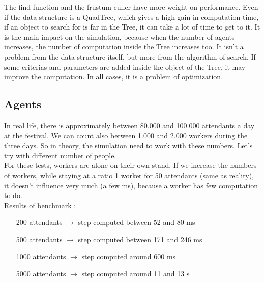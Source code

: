 The find function and the frustum culler have more weight on performance. Even if the data structure is a QuadTree, which gives a high gain in computation time, if an object to search for is far in the Tree, it can take a lot of time to get to it. It is the main impact on the simulation, because when the number of agents increases, the number of computation inside the Tree increases too. It isn’t a problem from the data structure itself, but more from the algorithm of search. If some criterias and parameters are added inside the object of the Tree, it may improve the computation. In all cases, it is a problem of optimization.

\subsection{Agents}

In real life, there is approximately between 80.000 and 100.000 attendants a day at the festival. We can count also between 1.000 and 2.000 workers during the three days. So in theory, the simulation need to work with these numbers. Let’s try with different number of people.\\
 
For these tests, workers are alone on their own stand. If we increase the numbers of workers, while staying at a ratio 1 worker for 50 attendants (same as reality), it doesn’t influence very much (a few ms), because a worker has few computation to do.\\

Results of benchmark :\\

\begin{itemize}
	\item[200 attendants] $\rightarrow$ step computed between 52 and 80 ms
	\item[500 attendants] $\rightarrow$ step computed between 171 and 246 ms
	\item[1000 attendants] $\rightarrow$ step computed around 600 ms
	\item[5000 attendants] $\rightarrow$ step computed around 11 and 13 s
\end{itemize}